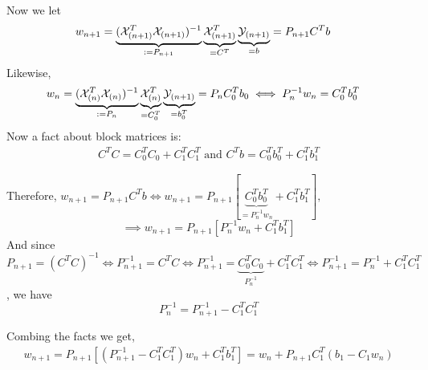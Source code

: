 Now we let 
\begin{align}
    w_{n+1} &= \underbrace{(\mathcal X_{(n+1)}^T \mathcal X_{(n+1)})^{-1} }_{:=  P_{n+1}}
    \underbrace{\mathcal X_{(n+1)}^T}_{= C^T} 
    \underbrace{\mathcal Y_{(n+1)}}_{= b}
    = P_{n+1} C^T b 
\end{align}
Likewise, 
\begin{align}
    w_{n} &= \underbrace{(\mathcal X_{(n)}^T \mathcal X_{(n)})^{-1} }_{:=  P_{n}}
    \underbrace{\mathcal X_{(n)}^T}_{= C_0^T} 
    \underbrace{\mathcal Y_{(n+1)}}_{= b_0^T}
    = P_{n} C_0^T b_0 \iff P_n^{-1}w_n = C_0^{T}b_0^T 
\end{align}
Now a fact about block matrices is:
\begin{align}
    C^TC = C_0^T C_0 + C_1^T C_1^T \text{ and } 
    C^Tb = C_0^T b_0^T + C_1^Tb_1^T
\end{align}

Therefore,
$
w_{n+1} =  P_{n+1} C^T b  \iff w_{n+1} = P_{n+1} 
[\underbrace{C_0^T b_0^T}_{=P_n^{-1}w_n} + C_1^Tb_1^T],
$
$$
\implies w_{n+1} = P_{n+1} [P_n^{-1}  w_n + C_1^Tb_1^T]
$$
And since  $
P_{n+1} = (C^TC)^{-1} \iff P_{n+1}^{-1} = C^TC \iff
P_{n+1}^{-1} = \underbrace{C_0^T C_0}_{P_n^{-1}} + C_1^T C_1^T 
\iff P_{n+1}^{-1} = P_n^{-1} + C_1^T C_1^T 
$, we have 
$$
P_n^{-1} = P_{n+1}^{-1} - C_1^T C_1^T 
$$

Combing the facts we get,
\begin{align*}
    w_{n+1} = P_{n+1} [(P_{n+1}^{-1} - C_1^T C_1^T)w_n + C_1^Tb_1^T]
    = w_n + P_{n+1}C_1^T(b_1 -C_1w_n)
\end{align*}

